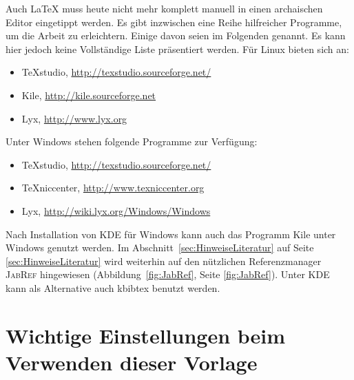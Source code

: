 Auch \LaTeX{} muss heute nicht mehr komplett manuell in einen archaischen Editor
eingetippt werden. Es gibt inzwischen eine Reihe hilfreicher Programme, um die
Arbeit zu erleichtern. Einige davon seien im Folgenden genannt. Es kann hier
jedoch keine Vollständige Liste präsentiert werden.
Für Linux bieten sich an:
\begin{itemize}
 \item TeXstudio, \url{http://texstudio.sourceforge.net/}
 \item Kile, \url{http://kile.sourceforge.net}
 \item Lyx, \url{http://www.lyx.org}
\end{itemize}
Unter Windows stehen folgende Programme zur Verfügung:
\begin{itemize}
 \item TeXstudio, \url{http://texstudio.sourceforge.net/}
 \item {\TeX}niccenter, \url{http://www.texniccenter.org}
 \item Lyx, \url{http://wiki.lyx.org/Windows/Windows}
\end{itemize}
Nach Installation von KDE für Windows kann auch das Programm Kile unter Windows
genutzt werden. Im Abschnitt~\ref{sec:HinweiseLiteratur} auf Seite
\ref{sec:HinweiseLiteratur} wird weiterhin auf den nützlichen Referenzmanager
\textsc{JabRef} hingewiesen (Abbildung~\ref{fig:JabRef}, Seite
\ref{fig:JabRef}). Unter KDE kann als Alternative auch kbibtex benutzt werden.


\section{Wichtige Einstellungen beim Verwenden dieser Vorlage}

